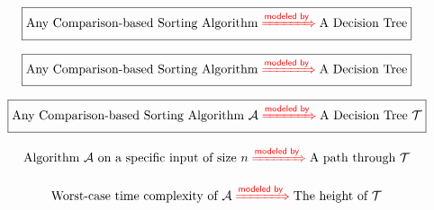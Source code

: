 \begin{frame}{}
  \begin{center}
    {\Large {}} 
  \end{center}

  \vspace{-0.40cm}
  \[
    \boxed{\text{Any Comparison-based Sorting Algorithm} \;\textcolor{red}{\xRightarrow{ \textsf{modeled by} }}\; \text{A Decision Tree}}
  \]

  \pause
  
\end{frame}

\begin{frame}{}
  \begin{center}
    {\Large {}} 
  \end{center}

  \vspace{-0.40cm}
  \[
    \boxed{\text{Any Comparison-based Sorting Algorithm} \;\textcolor{red}{\xRightarrow{ \textsf{modeled by} }}\; \text{A Decision Tree}}
  \]

\end{frame}

\begin{frame}{}
  \begin{center}
    {\Large {}} 
  \end{center}

  \vspace{-0.40cm}
  \[
    \boxed{\text{Any Comparison-based Sorting Algorithm } \mathcal{A} \;\textcolor{red}{\xRightarrow{\textsf{modeled by}}}\; \text{A Decision Tree } \mathcal{T}}
  \]

  \pause
  \[
    \text{Algorithm $\mathcal{A}$ on a specific input of size } n \;\textcolor{red}{\xRightarrow{\textsf{modeled by}}}\; \text{A path through } \mathcal{T}
  \]

  \pause
  \[
    \text{Worst-case time complexity of $\mathcal{A}$} \;\textcolor{red}{\xRightarrow{\textsf{modeled by}}}\; \text{The height of } \mathcal{T}
  \]

  \pause
  \vspace{0.50cm}
  \centering
\end{frame}

